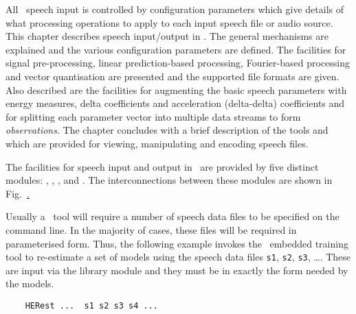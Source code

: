 All \HTK\ speech input is controlled by configuration
parameters which give details of what processing operations to apply to each
input speech file or audio source.  This chapter describes speech input/output
in \HTK.  The general mechanisms are explained and the various configuration
parameters are defined.  The facilities for signal pre-processing, linear
prediction-based processing, Fourier-based processing and vector quantisation
are presented and the supported file formats are given.  Also described are the
facilities for augmenting the basic speech parameters with energy measures,
delta coefficients and acceleration (delta-delta) coefficients and for
splitting each parameter vector into multiple data streams to form
\textit{observations}.  The chapter concludes with a brief description of the
tools  and  which are provided for viewing,
manipulating and encoding speech files.


The facilities for speech input and output in \HTK\ are provided
by five distinct modules: , ,
,  and .  The interconnections
between these modules are shown in Fig.~\href{f:Spmods}.  


Usually a \HTK\ tool will require a number of speech data files to be
specified on the command line.  In the majority of cases, these
files will be required in parameterised form.  Thus, the following example
invokes the \HTK\ embedded training tool 
to re-estimate a set of models using the speech data
files \texttt{s1}, \texttt{s2}, \texttt{s3}, \ldots .  These are
input via the library module  and they
must be in exactly the form needed by the models.
\begin{verbatim}
    HERest ...  s1 s2 s3 s4 ...
\end{verbatim}


